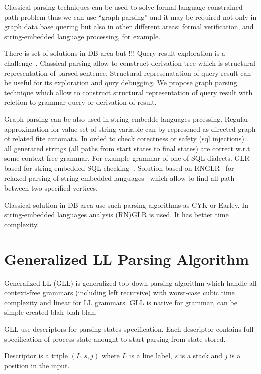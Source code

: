 \documentclass{sig-alternate} %
\begin{document}
Classical parsing techniques can be used to solve formal language constrained path problem thus we can use ``graph parsing'' and it may be required not only in graph data base quering but also in other 
different areas: formal verification, and string-embedded language processing, for example.

There is set of solutions in DB area but !!! Query result exploration is a challenge~\cite{hofman2015separabilityForRegQueryDebugging}. 
Classical parsing allow to construct derivation tree which is structural representation of parsed sentence.
Structural represenatation of query result can be useful for its exploration and qury debugging.
We propose graph parsing technique which allow to construct structural representation of query result with reletion to grammar query or derivation of result.

Graph parsing can be also used in string-embedde languages prcessing. 
Regular approximation for value set of string variable can by represened as directed graph of related fite automata.
In orded to check corectness or safety (sql injections)... all generated strings (all paths from start states to final states) are correct w.r.t some context-free grammar.
For example grammar of one of SQL dialects.
GLR-based for string-embedded SQL checking~\cite{Alvor1, Alvor2}.
Solution based on RNGLR~\cite{rnglr} for relaxed parsing of string-embedded languages~\cite{relaxedRNGLR} which allow to find all path between two specified vertices.

Classical solution in DB area use such parsing algorithms as CYK or Earley.
In string-embedded languages analysis (RN)GLR is used.
It has better time complexity.

\section{Generalized LL Parsing Algorithm}

Generalized LL (GLL) is generalized top-down parsing algorithm which handle all context-free grammars (including left recursive) with worst-case cubic time complexity and linear for LL grammars.
GLL is native for grammar, can be simple created blah-blah-blah.

GLL use descriptors for parsing states specification.
Each descriptor contains full specification of process state anought to start parsing from state stored.

Descriptor is a triple $(L, s, j)$ where $L$ is a line label, $s$ is a stack and $j$ is a position in the input.
\end{document}
